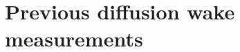 \documentclass[
  a4paper,
  12pt,
  oneside,
  parskip=half,
  listof=totoc,
  bibliography=totoc,
  DIV=12,
  numbers=noenddot,
  BA.tex
  ]{subfiles}
\begin{document}
\section{Previous diffusion wake measurements}
\end{document}
